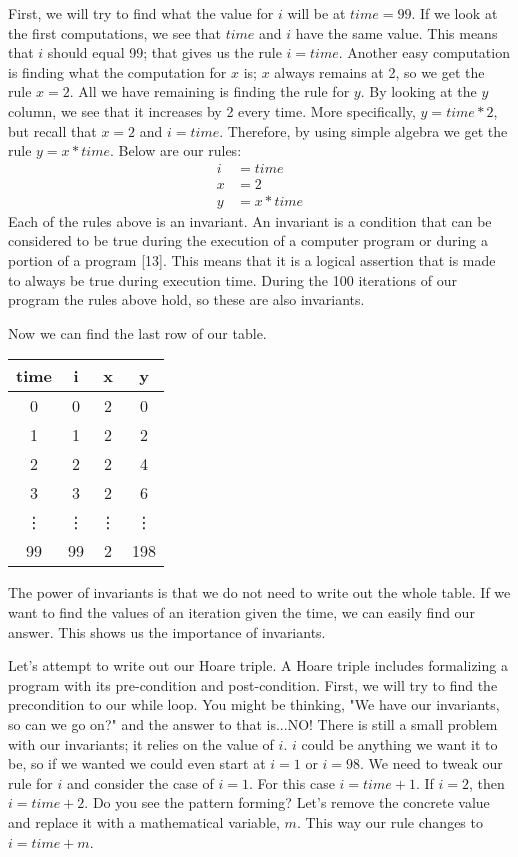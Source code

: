 \documentclass{article}
\begin{document}
\vspace{\baselineskip}
First, we will try to find what the value for $i$ will be at $time = 99$. If we look at the first computations, we see that $time$ and $i$ have the same value. This means that $i$ should equal 99; that gives us the rule $i = time$. Another easy computation is finding what the computation for $x$ is; $x$ always remains at 2, so we get the rule $x = 2$. All we have remaining is finding the rule for $y$. By looking at the $y$ column, we see that it increases by 2 every time. More specifically, $y = time * 2$, but recall that $x = 2 $ and $i = time$. Therefore, by using simple algebra we get the rule $y = x * time$. Below are our rules:
\begin{align}
    i &= time \\
    x &= 2 \\
    y &= x * time
\end{align}
Each of the rules above is an invariant. An invariant is a condition that can be considered to be true during the execution of a computer program or during a portion of a program [13]. This means that it is a logical assertion that is made to always be true during execution time. During the 100 iterations of our program the rules above hold, so these are also invariants. 

\vspace{\baselineskip}
Now we can find the last row of our table.
\begin{center}
\begin{tabular}{||c c c c||} 
 \hline
 time & i & x & y \\ [0.5ex] 
 \hline\hline
 0 & 0 & 2 & 0\\ 
 \hline
 1 & 1 & 2 & 2 \\
 \hline
 2 & 2 & 2 & 4 \\
 \hline
 3 & 3 & 2 & 6 \\ 
 \hline
 \vdots & \vdots & \vdots & \vdots \\ 
 \hline
 99 & 99 & 2 & 198 \\ 
 \hline
\end{tabular}
\end{center}
The power of invariants is that we do not need to write out the whole table. If we want to find the values of an iteration given the time, we can easily find our answer. This shows us the importance of invariants.

\vspace{\baselineskip}
Let's attempt to write out our Hoare triple. A Hoare triple includes formalizing a program with its pre-condition and post-condition. First, we will try to find the precondition to our while loop. You might be thinking, "We have our invariants, so can we go on?" and the answer to that is...NO! There is still a small problem with our invariants; it relies on the value of $i$. $i$ could be anything we want it to be, so if we wanted we could even start at $i = 1$ or $i = 98$. We need to tweak our rule for $i$ and consider the case of $i = 1$. For this case $i = time + 1$. If $i = 2$, then $i = time + 2$. Do you see the pattern forming? Let's remove the concrete value and replace it with a mathematical variable, $m$. This way our rule changes to $i = time + m$.
\end{document}
